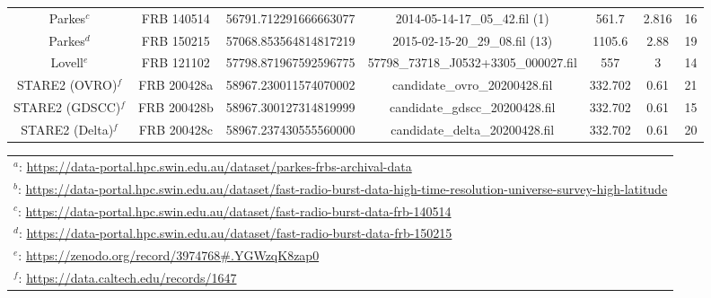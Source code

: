 \begin{sidewaystable}
\begin{tabular}{ccccccc}
        Parkes$^{c}$         & FRB 140514 & 56791.712291666663077 & 2014-05-14-17\_05\_42.fil (1)            & 561.7       & 2.816    & 16   \\
        Parkes$^{d}$          & FRB 150215 & 57068.853564814817219 & 2015-02-15-20\_29\_08.fil (13)            & 1105.6      & 2.88     & 19   \\
        Lovell$^{e}$          & FRB 121102 & 57798.871967592596775 & 57798\_73718\_J0532+3305\_000027.fil & 557         & 3        & 14   \\
        STARE2 (OVRO)$^{f}$  & FRB 200428a & 58967.230011574070002 & candidate\_ovro\_20200428.fil        & 332.702     & 0.61     & 21   \\
        STARE2 (GDSCC)$^{f}$ & FRB 200428b & 58967.300127314819999 & candidate\_gdscc\_20200428.fil       & 332.702     & 0.61     & 15   \\
        STARE2 (Delta)$^{f}$ & FRB 200428c & 58967.237430555560000 & candidate\_delta\_20200428.fil       & 332.702     & 0.61     & 20  \\
        \hline
        \end{tabular}
    \footnotesize{
    \begin{tabular}{l}
        \\
        $^{a}$: \url{https://data-portal.hpc.swin.edu.au/dataset/parkes-frbs-archival-data} \\
        $^{b}$: \url{https://data-portal.hpc.swin.edu.au/dataset/fast-radio-burst-data-high-time-resolution-universe-survey-high-latitude} \\
        $^{c}$: \url{https://data-portal.hpc.swin.edu.au/dataset/fast-radio-burst-data-frb-140514} \\
        $^{d}$: \url{https://data-portal.hpc.swin.edu.au/dataset/fast-radio-burst-data-frb-150215} \\
        $^{e}$: \url{https://zenodo.org/record/3974768#.YGWzqK8zap0} \\
        $^{f}$: \url{https://data.caltech.edu/records/1647}
    \end{tabular}}
    \label{tab:frbdata}
\end{sidewaystable}